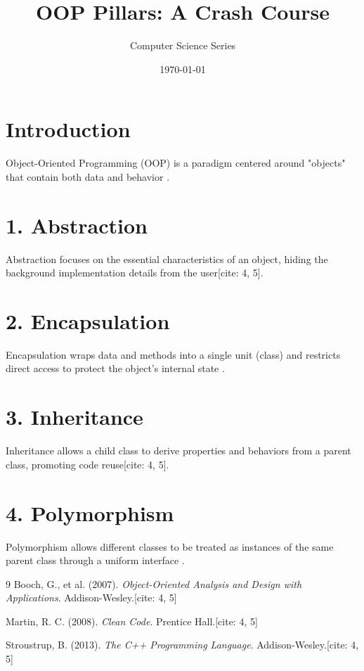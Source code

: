 \documentclass[12pt]{article}
\title{OOP Pillars: A Crash Course}
\author{Computer Science Series}
\date{\today}
\begin{document}
\maketitle

\section{Introduction}
Object-Oriented Programming (OOP) is a paradigm centered around "objects" that contain both data and behavior \cite{grady2007}.

\section{1. Abstraction}
Abstraction focuses on the essential characteristics of an object, hiding the background implementation details from the user[cite: 4, 5].

\section{2. Encapsulation}
Encapsulation wraps data and methods into a single unit (class) and restricts direct access to protect the object's internal state \cite{martin2008}.

\section{3. Inheritance}
Inheritance allows a child class to derive properties and behaviors from a parent class, promoting code reuse[cite: 4, 5].

\section{4. Polymorphism}
Polymorphism allows different classes to be treated as instances of the same parent class through a uniform interface \cite{stroustrup2013}.

\begin{thebibliography}{9}
Booch, G., et al. (2007). \textit{Object-Oriented Analysis and Design with Applications}. Addison-Wesley.[cite: 4, 5]

Martin, R. C. (2008). \textit{Clean Code}. Prentice Hall.[cite: 4, 5]

Stroustrup, B. (2013). \textit{The C++ Programming Language}. Addison-Wesley.[cite: 4, 5]
\end{thebibliography}
\end{document}
